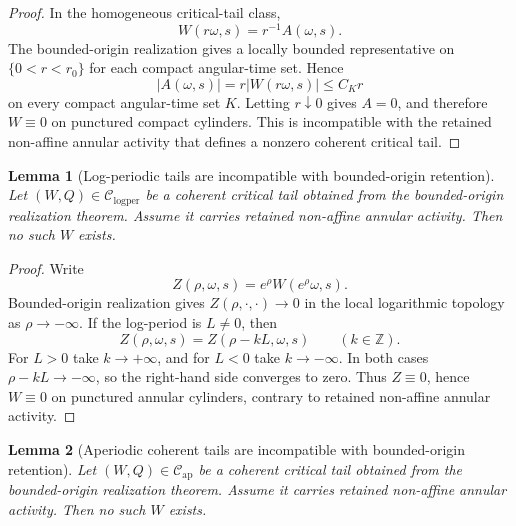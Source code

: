 \documentclass[11pt]{amsart}
\numberwithin{equation}{section}
\theoremstyle{plain}
\newtheorem{lemma}[lemma]{Lemma}
\theoremstyle{definition}
\theoremstyle{remark}
\newcommand{\Clogper}{\mathcal C_{\mathrm{logper}}}
\newcommand{\Capcrit}{\mathcal C_{\mathrm{ap}}}
\begin{document}
\begin{proof}
In the homogeneous critical-tail class,
\[
   W(r\omega,s)=r^{-1}A(\omega,s).
\]
The bounded-origin realization gives a locally bounded representative on
\(\{0<r<r_0\}\) for each compact angular-time set.  Hence
\[
   |A(\omega,s)|=r|W(r\omega,s)|\le C_K r
\]
on every compact angular-time set \(K\).  Letting \(r\downarrow0\) gives
\(A=0\), and therefore \(W\equiv0\) on punctured compact cylinders.  This is
incompatible with the retained non-affine annular activity that defines a
nonzero coherent critical tail.
\end{proof}

\begin{lemma}[Log-periodic tails are incompatible with bounded-origin retention]
\label{lem:logperiodic-tail-bounded-origin-closure}
Let \((W,Q)\in\Clogper\) be a coherent critical tail obtained from the
bounded-origin realization theorem.  Assume it carries retained non-affine
annular activity.  Then no such \(W\) exists.
\end{lemma}

\begin{proof}
Write
\[
   Z(\rho,\omega,s)=e^\rho W(e^\rho\omega,s).
\]
Bounded-origin realization gives \(Z(\rho,\cdot,\cdot)\to0\) in the local
logarithmic topology as \(\rho\to-\infty\).  If the log-period is
\(L\ne0\), then
\[
   Z(\rho,\omega,s)=Z(\rho-kL,\omega,s)
   \qquad(k\in\mathbb Z).
\]
For \(L>0\) take \(k\to+\infty\), and for \(L<0\) take \(k\to-\infty\).  In
both cases \(\rho-kL\to-\infty\), so the right-hand side converges to zero.
Thus \(Z\equiv0\), hence \(W\equiv0\) on punctured annular cylinders, contrary
to retained non-affine annular activity.
\end{proof}

\begin{lemma}[Aperiodic coherent tails are incompatible with bounded-origin retention]
\label{lem:aperiodic-tail-bounded-origin-closure}
Let \((W,Q)\in\Capcrit\) be a coherent critical tail obtained from the
bounded-origin realization theorem.  Assume it carries retained non-affine
annular activity.  Then no such \(W\) exists.
\end{lemma}
\end{document}
